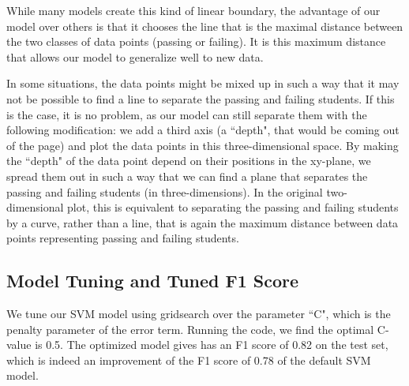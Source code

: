\documentclass[12 pt]{article}
\numberwithin{equation}{section}
\begin{document}
While many models create this kind of linear boundary, the advantage of our model over others is that it chooses the line that is the maximal distance between the two classes of data points (passing or failing). It is this maximum distance that allows our model to generalize well to new data.

In some situations, the data points might be mixed up in such a way that it may not be possible to find a line to separate the passing and failing students. If this is the case, it is no problem, as our model can still separate them with the following modification: we add a third axis (a ``depth", that would be coming out of the page) and plot the data points in this three-dimensional space. By making the ``depth" of the data point depend on their positions in the xy-plane, we spread them out in such a way that we can find a plane that separates the passing and failing students (in three-dimensions). In the original two-dimensional plot, this is equivalent to separating the passing and failing students by a curve, rather than a line, that is again the maximum distance between data points representing passing and failing students.

\subsection{Model Tuning and Tuned F1 Score}
We tune our SVM model using gridsearch over the parameter ``C", which is the penalty parameter of the error term. Running the code, we find the optimal C-value is 0.5. The optimized model gives has an F1 score of 0.82 on the test set, which is indeed an improvement of the F1 score of 0.78 of the default SVM model.
\end{document}
